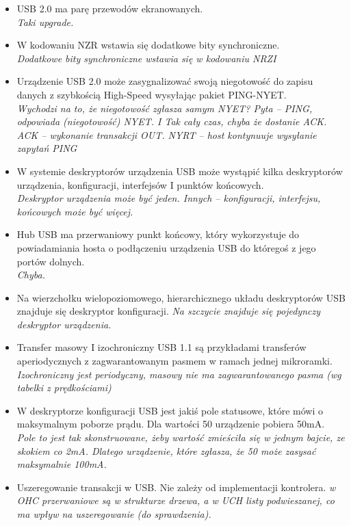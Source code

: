 \documentclass[a4paper,twoside]{article}
\begin{document}
\begin{itemize}
	\item \textcolor{tak}{USB 2.0 ma parę przewodów ekranowanych.} \\
	{\small \emph{Taki upgrade.}}
	
	\item \textcolor{nie}{W kodowaniu NZR wstawia się dodatkowe bity synchroniczne.} \\
	{\small \emph{Dodatkowe bity synchroniczne wstawia się w kodowaniu NRZI}}
		
	\item \textcolor{nie}{Urządzenie USB 2.0 może zasygnalizować swoją niegotowość do zapisu danych z szybkością High-Speed wysyłając pakiet PING-NYET.} \\
	{\small \emph{Wychodzi na to, że niegotowość zgłasza samym NYET? Pyta – PING, odpowiada (niegotowość) NYET. I Tak cały czas, chyba że dostanie ACK. ACK – wykonanie transakcji OUT. NYRT – host kontynuuje wysyłanie zapytań PING}}
	
	\item \textcolor{nie}{W systemie deskryptorów urządzenia USB może wystąpić kilka deskryptorów urządzenia, konfiguracji, interfejsów I punktów końcowych.} \\
	{\small \emph{Deskryptor urządzenia może być jeden. Innych – konfiguracji, interfejsu, końcowych może być więcej.}}
	
	\item \textcolor{tak}{Hub USB ma przerwaniowy punkt końcowy, który wykorzystuje do powiadamiania hosta o podłączeniu	urządzenia USB do któregoś z jego portów dolnych.} \\
	{\small \emph{Chyba.}}
	
	\item \textcolor{nie}{Na wierzchołku wielopoziomowego, hierarchicznego układu deskryptorów USB znajduje się deskryptor konfiguracji.}
	{\small \emph{Na szczycie znajduje się pojedynczy deskryptor urządzenia.}}
	
	\item \textcolor{nie}{Transfer masowy I izochroniczny USB 1.1 są przykładami transferów aperiodycznych z zagwarantowanym pasmem w ramach jednej mikroramki.} \\
	{\small \emph{Izochroniczny jest periodyczny, masowy nie ma zagwarantowanego pasma (wg tabelki z	prędkościami)}}
	
	\item \textcolor{nie}{W deskryptorze konfiguracji USB jest jakiś pole statusowe, które mówi o maksymalnym poborze prądu. Dla wartości 50 urządzenie pobiera 50mA.} \\
	{\small \emph{Pole to jest tak skonstruowane, żeby wartość zmieściła się w jednym bajcie, ze skokiem co 2mA. Dlatego urządzenie, które zgłasza, że 50 może zasysać maksymalnie 100mA.}}
	
	\item \textcolor{nie}{Uszeregowanie transakcji w USB. Nie zależy od implementacji kontrolera.}
	{\small \emph{w OHC przerwaniowe są w strukturze drzewa, a w UCH listy podwieszanej, co ma wpływ na uszeregowanie (do sprawdzenia).}}
	
	
\end{itemize}
\end{document}
